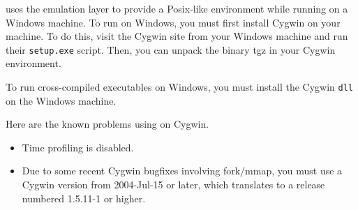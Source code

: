 
{\mlton} uses the 
emulation layer to provide a Posix-like environment while running on a
Windows machine.  To run {\mlton} on Windows, you must first install
Cygwin on your machine.  To do this, visit the Cygwin site from your
Windows machine and run their {\tt setup.exe} script.  Then, you can
unpack the {\mlton} binary tgz in your Cygwin environment.

To run {\mlton} cross-compiled executables on Windows, you must
install the Cygwin {\tt dll} on the Windows machine.

Here are the known problems using {\mlton} on Cygwin.

\begin{itemize}

\item Time profiling is disabled.

\item Due to some recent Cygwin bugfixes involving fork/mmap, you must
use a Cygwin version from 2004-Jul-15 or later, which translates to a
release numbered 1.5.11-1 or higher.

\end{itemize}
